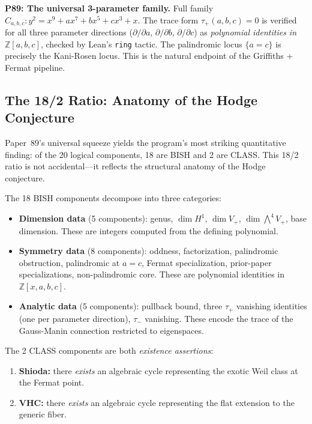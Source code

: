\documentclass[11pt,twoside,openany]{report}
\theoremstyle{remark}
\newcommand{\BISH}{\textsf{BISH}}
\newcommand{\CLASS}{\textsf{CLASS}}
\begin{document}
\textbf{P89: The universal 3-parameter family.}
Full family $C_{a,b,c}: y^2 = x^9 + ax^7 + bx^5 + cx^3 + x$. The trace form $\tau_+(a,b,c) = 0$ is verified for all three parameter directions ($\partial/\partial a$, $\partial/\partial b$, $\partial/\partial c$) as \emph{polynomial identities in $\mathbb{Z}[a,b,c]$}, checked by Lean's \texttt{ring} tactic. The palindromic locus $\{a = c\}$ is precisely the Kani-Rosen locus. This is the natural endpoint of the Griffiths + Fermat pipeline.

\subsection*{The 18/2 Ratio: Anatomy of the Hodge Conjecture}

Paper~89's universal squeeze yields the program's most striking quantitative finding: of the 20 logical components, 18 are \BISH{} and 2 are \CLASS. This 18/2 ratio is not accidental---it reflects the structural anatomy of the Hodge conjecture.

The 18 \BISH{} components decompose into three categories:
\begin{itemize}
  \item \textbf{Dimension data} (5 components): genus, $\dim H^1$, $\dim V_+$, $\dim \bigwedge^4 V_+$, base dimension. These are integers computed from the defining polynomial.
  \item \textbf{Symmetry data} (8 components): oddness, factorization, palindromic obstruction, palindromic at $a = c$, Fermat specialization, prior-paper specializations, non-palindromic core.  These are polynomial identities in $\mathbb{Z}[x,a,b,c]$.
  \item \textbf{Analytic data} (5 components): pullback bound, three $\tau_+$ vanishing identities (one per parameter direction), $\tau_-$ vanishing. These encode the trace of the Gauss-Manin connection restricted to eigenspaces.
\end{itemize}

The 2 \CLASS{} components are both \emph{existence assertions}:
\begin{enumerate}
  \item \textbf{Shioda:} there \emph{exists} an algebraic cycle representing the exotic Weil class at the Fermat point.
  \item \textbf{VHC:} there \emph{exists} an algebraic cycle representing the flat extension to the generic fiber.
\end{enumerate}
\end{document}
